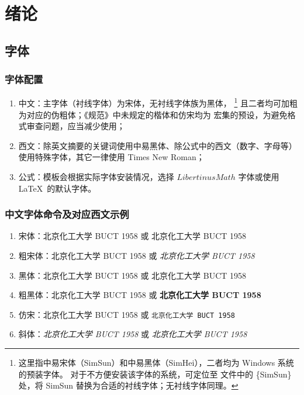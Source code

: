 \chapter{绪论}
\section{字体}
\subsection{字体配置}
\begin{enumerate}
	\item 中文：主字体（衬线字体）为宋体，无衬线字体族为黑体，%
	\footnote{这里指中易宋体（SimSun）和中易黑体（SimHei），二者均为 Windows 系统的预装字体。
	对于不方便安装该字体的系统，可定位至 
	文件中的 \{SimSun\} 处，将 SimSun 替换为合适的衬线字体；无衬线字体同理。}
	且二者均可加粗为对应的伪粗体；《规范》中未规定的楷体和仿宋均为  宏集的预设，为避免格式审查问题，应当减少使用；
	\item 西文：除英文摘要的关键词使用中易黑体、除公式中的西文（数字、字母等）使用特殊字体，其它一律使用 Times New Roman；
	\item 公式：模板会根据实际字体安装情况，选择 $LibertinusMath$ 字体或使用 \LaTeX\ 的默认字体。
\end{enumerate}

\subsection{中文字体命令及对应西文示例}
\begin{enumerate}
	\item 宋体：北京化工大学 BUCT 1958 或 \textrm{北京化工大学 BUCT 1958}
	\item 粗宋体：{\bfsong 北京化工大学 BUCT 1958} 或 \emph{北京化工大学 BUCT 1958}
	\item 黑体：{\heiti 北京化工大学 BUCT 1958} 或 \textsf{北京化工大学 BUCT 1958}
	\item 粗黑体：{\bfhei 北京化工大学 BUCT 1958} 或 \textsf{\bfseries 北京化工大学 BUCT 1958}
	\item 仿宋：{\ttfamily 北京化工大学 BUCT 1958} 或 \texttt{北京化工大学 BUCT 1958}
	\item 斜体：{\itshape 北京化工大学 BUCT 1958} 或 \textit{北京化工大学 BUCT 1958}
\end{enumerate}

